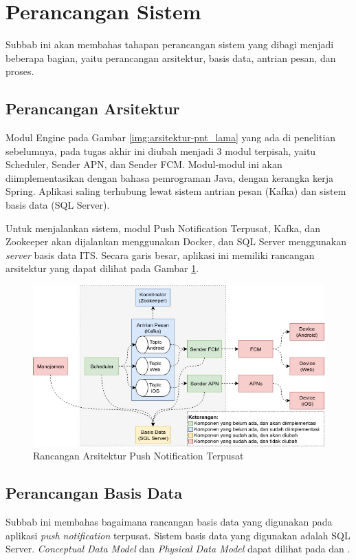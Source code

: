 \section{Perancangan Sistem}
\par Subbab ini akan membahas tahapan perancangan sistem yang dibagi menjadi beberapa bagian, yaitu perancangan arsitektur, basis data, antrian pesan, dan proses.

\subsection{Perancangan Arsitektur} \label{s:perancangan_arsitektur}
\par Modul Engine pada Gambar \ref{img:arsitektur-pnt_lama} yang ada di penelitian sebelumnya, pada tugas akhir ini diubah menjadi 3 modul terpisah, yaitu Scheduler, Sender APN, dan Sender FCM. Modul-modul ini akan diimplementasikan dengan bahasa pemrograman Java, dengan kerangka kerja Spring. Aplikasi saling terhubung lewat sistem antrian pesan (Kafka) dan sistem basis data (SQL Server).
\par Untuk menjalankan sistem, modul Push Notification Terpusat, Kafka, dan Zookeeper akan dijalankan menggunakan Docker, dan SQL Server menggunakan \textit{server} basis data ITS. Secara garis besar, aplikasi ini memiliki rancangan arsitektur yang dapat dilihat pada Gambar \ref{img:arsitektur_baru}.
\clearpage
\begin{figure}[H]
    \includegraphics[width=1\textwidth]{bab3/img/arsitektur-push_notification_terpusat_baru.jpg}
    \caption{Rancangan Arsitektur Push Notification Terpusat} \label{img:arsitektur_baru}
\end{figure}

\subsection{Perancangan Basis Data}
\par Subbab ini membahas bagaimana rancangan basis data yang digunakan pada aplikasi \textit{push notification} terpusat. Sistem basis data yang digunakan adalah SQL Server. \textit{Conceptual Data Model} dan \textit{Physical Data Model} dapat dilihat pada  dan .

